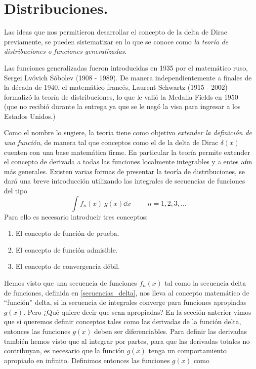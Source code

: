 \documentclass[12pt]{beamer}
\begin{document}
\section{Distribuciones.}
Las ideas que nos permitieron desarrollar el concepto de la delta de Dirac previamente, se pueden sistematizar en lo que se conoce como \emph{la teoría de distribuciones o funciones generalizadas}.
\par
Las funciones generalizadas fueron introducidas en 1935 por el matemático ruso, Sergei Lvóvich Sóbolev (1908 - 1989). De manera independientemente a finales de la década de 1940, el matemático francés, Laurent Schwartz (1915 - 2002) formalizó la teoría de distribuciones, lo que le valió la Medalla Fields en 1950 (que no recibió durante la entrega ya que se le negó la visa para ingresar a los Estados Unidos.)
\par
Como el nombre lo sugiere, la teoría tiene como objetivo  \emph{extender la definición de una función}, de manera tal que conceptos como el de la delta de Dirac $\delta (x)$ cuenten con una base matemática firme. En particular la teoría permite extender el concepto de derivada a todas las funciones localmente integrables y a entes aún más generales. Existen varias formas de presentar la teoría de distribuciones, se dará una breve introducción utilizando las integrales de secuencias de funciones del tipo
\begin{equation}
\int f_{n}(x) \: g(x) \dd{x} \hspace{1cm} n = 1, 2, 3 , \ldots
\label{eq:ecuacion_1_99}
\end{equation}
Para ello es necesario introducir tres conceptos:
\begin{enumerate}
\item El concepto de función de prueba.
\item El concepto de función admisible.
\item El concepto de convergencia débil.
\end{enumerate}
Hemos visto que una secuencia de funciones $f_{n}(x)$ tal como la secuencia delta de funciones, definida en \ref{secuencias_delta}, nos lleva al concepto matemático de \enquote{función} delta, si la secuencia de integrales converge para funciones apropiadas $g(x)$. Pero ¿Qué quiere decir que sean apropiadas? En la sección anterior vimos que si queremos definir conceptos tales como las derivadas de la función delta, entonces las funciones $g(x)$ deben ser diferenciables. Para definir las derivadas también hemos visto que al integrar por partes, para que las derivadas totales no contribuyan, es necesario que la función $g(x)$ tenga un comportamiento apropiado en infinito. Definimos entonces las funciones $g(x)$ como
\end{document}
